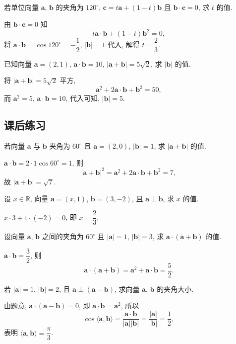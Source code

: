 \begin{exercise}
    若单位向量 $\bm{a}$, $\bm{b}$ 的夹角为 $120^\circ$, $\bm{c}= t\bm{a}+ (1-t)\bm{b}$ 且 $\bm{b}\cdot\bm{c}=0$, 求 $t$ 的值.
\end{exercise}
\beginsolution
    由 $\bm{b}\cdot\bm{c}=0$ 知
    \[t\bm{a}\cdot\bm{b}+ (1-t)\bm{b}^2= 0,\]
    将 $\bm{a}\cdot\bm{b}= \cos120^\circ= -\dfrac12$, $|\bm{b}|= 1$ 代入, 解得 $t= \dfrac23$.
\endsolution

\begin{exercise}
    已知向量 $\bm{a}=(2,1)$, $\bm{a}\cdot\bm{b}=10$, $|\bm{a}+\bm{b}|=5\sqrt2$, 求 $|\bm{b}|$ 的值.
\end{exercise}
\beginsolution
    将 $|\bm{a}+\bm{b}|=5\sqrt2$ 平方,
    \[\bm{a}^2+ 2\bm{a}\cdot\bm{b}+ \bm{b}^2= 50,\]
    而 $\bm{a}^2= 5$, $\bm{a}\cdot\bm{b}=10$, 代入可知, $|\bm{b}|= 5$.
\endsolution

\subsection{课后练习}
\begin{exercise}
    若向量 $\bm{a}$ 与 $\bm{b}$ 夹角为 $60^\circ$ 且 $\bm{a}=(2,0)$, $|\bm{b}|=1$, 求 $|\bm{a}+\bm{b}|$ 的值.
\end{exercise}
\beginsolution
    $\bm{a}\cdot \bm{b}= 2\cdot 1\cos60^\circ= 1$, 则
    \[|\bm{a}+\bm{b}|^2= \bm{a}^2+ 2\bm{a}\cdot\bm{b}+ \bm{b}^2= 7,\]
    故 $|\bm{a}+\bm{b}|= \sqrt7$.
\endsolution

\begin{exercise}
    设 $x\in\mathbb{R}$, 向量 $\bm{a}=(x,1)$, $\bm{b}=(3,-2)$, 且 $\bm{a}\perp\bm{b}$, 求 $x$ 的值.
\end{exercise}
\beginsolution
    $x\cdot 3+ 1\cdot(-2)= 0$, 即 $x= \dfrac23$.
\endsolution

\begin{exercise}
    设向量 $\bm{a}$, $\bm{b}$ 之间的夹角为 $60^\circ$ 且 $|\bm{a}|=1$, $|\bm{b}|=3$, 求 $\bm{a}\cdot(\bm{a}+\bm{b})$ 的值.
\end{exercise}
\beginsolution
    $\bm{a}\cdot\bm{b}= \dfrac32$, 则 
    \[\bm{a}\cdot(\bm{a}+\bm{b})
        = \bm{a}^2+ \bm{a}\cdot\bm{b}
        = \frac52.\]
\endsolution

\begin{exercise}
    若 $|\bm{a}|=1$, $|\bm{b}|=2$, 且 $\bm{a}\perp(\bm{a}-\bm{b})$, 
    求向量 $\bm{a}$, $\bm{b}$ 的夹角大小.
\end{exercise}
\beginsolution
    由题意, $\bm{a}\cdot (\bm{a}-\bm{b})= 0$, 即 $\bm{a}\cdot\bm{b}= \bm{a}^2$, 所以
    \[\cos\langle\bm{a},\bm{b}\rangle
        = \frac{\bm{a}\cdot\bm{b}}{|\bm{a}| |\bm{b}|}
        = \frac{|\bm{a}|}{|\bm{b}|}
        = \frac12,\]
    表明 $\langle\bm{a},\bm{b}\rangle= \dfrac\pi3$.
\endsolution

